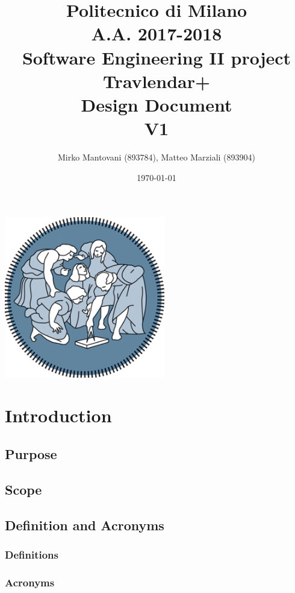 \documentclass{article}
\author{Mirko Mantovani (893784), Matteo Marziali (893904)}
\date{\today}
\title{Politecnico di Milano
	\\A.A. 2017\@-\@2018
	\\Software Engineering II project \\ \textbf{Travlendar+}
	\\
	\textbf{D}esign \textbf{D}ocument 
	\\
	\textbf{V1}}
\begin{document}
\maketitle
\begin{center}
	\includegraphics[width=7cm]{polimi-logo}
\end{center}
\clearpage
{\hypersetup{hidelinks}\tableofcontents}
\clearpage

\section{Introduction}

\subsection{Purpose}



\newpage
\subsection{Scope}




\clearpage

\subsection{Definition and Acronyms}

\subsubsection{Definitions}


\subsubsection{Acronyms}

\end{document}
